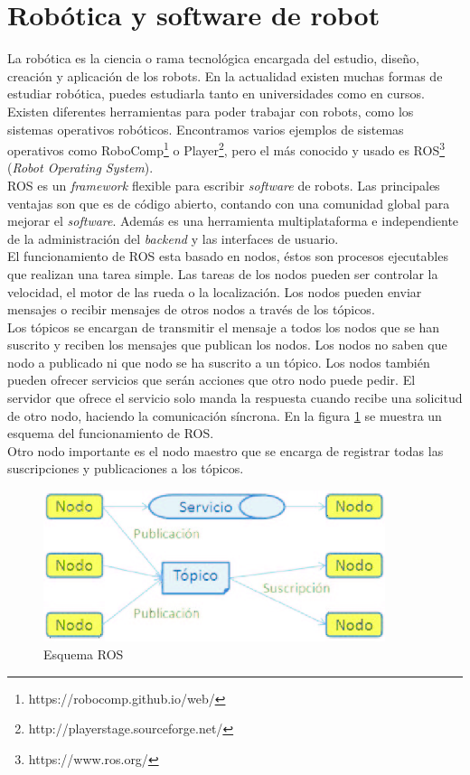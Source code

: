 \section{Robótica y software de robot}
La robótica es la ciencia o rama tecnológica encargada del estudio, diseño, creación y aplicación de los robots. En la actualidad existen muchas formas de estudiar robótica, puedes estudiarla tanto en universidades como en cursos. Existen diferentes herramientas para poder trabajar con robots, como los sistemas operativos robóticos. Encontramos varios ejemplos de sistemas operativos como RoboComp\footnote{https://robocomp.github.io/web/} o Player\footnote{http://playerstage.sourceforge.net/}, pero el más conocido y usado es ROS\footnote{https://www.ros.org/} (\textit{Robot Operating System}).\\

ROS  es un \textit{framework} flexible para escribir \textit{software} de robots. Las principales ventajas son que es de código abierto, contando con una comunidad global para mejorar el\textit{ software}. Además es una herramienta multiplataforma e independiente de la administración del \textit{backend} y las interfaces de usuario\cite{ros}.\\

El funcionamiento de ROS esta basado en nodos, éstos son procesos ejecutables que realizan una tarea simple. Las tareas de los nodos pueden ser controlar la velocidad, el motor de las rueda o la localización. Los nodos pueden enviar mensajes o recibir mensajes de otros nodos a través de los tópicos. \\

Los tópicos se encargan de transmitir el mensaje a todos los nodos que se han suscrito y reciben los mensajes que publican los nodos. Los nodos no saben que nodo a publicado ni que nodo se ha suscrito a un tópico. Los nodos también pueden ofrecer servicios que serán acciones que otro nodo puede pedir. El servidor que ofrece el servicio solo manda la respuesta cuando recibe una solicitud de otro nodo, haciendo la comunicación síncrona. En la figura \ref{fig:ros} se muestra un esquema del funcionamiento de ROS\cite{ros2}.\\

Otro nodo importante es el nodo maestro que se encarga de registrar todas las suscripciones y publicaciones a los tópicos.

\begin{figure}[H]
    \centering
    \includegraphics[width=10cm, keepaspectratio]{img/ros.png}
    \caption{Esquema ROS}
    \label{fig:ros}
\end{figure}

